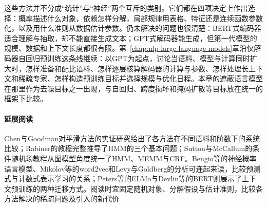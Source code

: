 这些方法并不分成“统计”与“神经”两个互斥的类别。它们都在四项决定上作出选择：概率描述什么对象，依赖怎样分解，局部规律用表格、特征还是连续函数参数化，以及用什么准则从数据估计参数。仍未解决的问题也很清楚：BERT式编码器适合理解与抽取，却不能直接生成文本；GPT式解码器能生成，但第一代模型的规模、数据和上下文长度都很有限。第~\ref{chap:nlp-large-language-models}章沿仅解码器自回归预训练这条线继续：以GPT为起点，讨论当语料、模型与计算同时扩大时，怎样准备和配比语料、怎样逐层核算解码器的计算与参数、怎样处理长上下文和稀疏专家、怎样构造预训练目标并选择规模与优化日程。本章的遮蔽语言模型在那里作为去噪目标之一出现，与自回归、跨度损坏和掩码扩散等目标放在统一的框架下比较。

\paragraph{延展阅读}
Chen与Goodman对平滑方法的实证研究给出了各方法在不同语料和阶数下的系统比较；Rabiner的教程完整推导了HMM的三个基本问题；Sutton与McCallum的条件随机场教程从图模型角度统一了HMM、MEMM与CRF。Bengio等的神经概率语言模型、Mikolov等的word2vec和Levy与Goldberg的分析可连起来读，比较预测式与计数式表示学习的关系；Peters等的ELMo与Devlin等的BERT则展示了上下文预训练的两种迁移方式。阅读时宜固定随机对象、分解假设与估计准则，比较各方法解决的稀疏问题及引入的新代价
